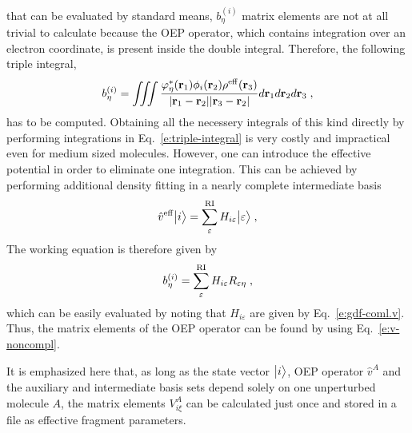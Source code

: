 that can be evaluated by standard means,
$b^{(i)}_\eta$ matrix elements are not at all trivial to calculate
because the OEP operator, which contains integration over an electron coordinate,
is present inside the double integral. Therefore, the following triple integral,
%
\begin{equation} \label{e:triple-integral}
 b^{(i)}_\eta = \iiint 
           \frac{ \varphi^*_\eta({\bf r}_1) \phi_i({\bf r}_2)  \rho^{\rm eff}({\bf r}_3) }
            {\vert {\bf r}_1 - {\bf r}_2 \vert \vert {\bf r}_3 - {\bf r}_2 \vert}
           d{\bf r}_1 d{\bf r}_2 d{\bf r}_3 \;,
\end{equation}
%
has to be computed.
Obtaining all the necessery integrals of this kind directly 
by performing integrations in Eq.~\eqref{e:triple-integral} is very costly 
and impractical even for medium sized molecules. 
However, one can introduce the effective potential in order to eliminate one integration. 
This can be achieved by performing additional density fitting in a nearly complete intermediate basis 
%
\begin{equation}
 \hat{v}^{\rm eff} \Ket{i} = \sum_\varepsilon^{\rm RI} H_{i\varepsilon} \Ket{\varepsilon} \;,
\end{equation}
%
The working equation is therefore given by
%
\begin{equation}
 b^{(i)}_\eta = \sum_\varepsilon^{\rm RI} H_{i\varepsilon} R_{\varepsilon\eta} \;,
\end{equation}
%
which can be easily evaluated by noting that
$H_{i\varepsilon}$ are given by Eq.~\eqref{e:gdf-coml.v}.
Thus, the matrix elements of the OEP operator can be found
by using Eq.~\eqref{e:v-noncompl}.

It is emphasized here that, as long as the state vector $\Ket{i}$, OEP operator $\hat{v}^A$ 
and the auxiliary and intermediate basis sets depend solely on one unperturbed molecule $A$, the matrix elements
$V^A_{i\xi}$ can be calculated just once and stored in a file as effective fragment parameters.




